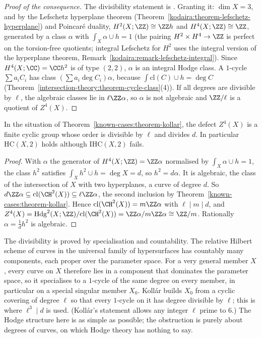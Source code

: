 \begin{proof}[Proof of the consequence]
The divisibility statement is \cite{kollar-1992}. Granting it: $\dim X = 3$, and by the Lefschetz hyperplane theorem (Theorem~\ref{kodaira:theorem-lefschetz-hyperplane}) and Poincar\'e duality,
$H^2(X; \ZZ) \cong \ZZ h$ and $H^4(X; \ZZ) \cong \ZZ$, generated by a class $\alpha$ with $\int_X\alpha \cup h = 1$ (the pairing $H^2 \times H^4 \to \ZZ$ is perfect on the torsion-free quotients; integral
Lefschetz for $H^2$ uses the integral version of the hyperplane theorem, Remark~\ref{kodaira:remark-lefschetz-integral}). Since $H^4(X; \CC) = \CC h^2$ is of type $(2,2)$, $\alpha$ is an integral Hodge class. A
$1$-cycle $\sum a_iC_i$ has class $(\sum a_i\deg C_i)\alpha$, because $\int\mathrm{cl}(C) \cup h = \deg C$ (Theorem~\ref{intersection-theory:theorem-cycle-class}(4)). If all degrees are divisible by $\ell$, the algebraic
classes lie in $\ell\ZZ\alpha$, so $\alpha$ is not algebraic and $\ZZ/\ell$ is a quotient of $Z^4(X)$.
\end{proof}

\begin{corollary}\label{known-cases:corollary-kollar-defect}
In the situation of Theorem~\ref{known-cases:theorem-kollar}, the defect $Z^4(X)$ is a finite cyclic group whose order is divisible by $\ell$ and divides $d$. In particular $\mathrm{HC}(X, 2)$ holds although
$\mathrm{IHC}(X, 2)$ fails.
\end{corollary}

\begin{proof}
With $\alpha$ the generator of $H^4(X; \ZZ) = \ZZ\alpha$ normalised by $\int_X\alpha \cup h = 1$, the class $h^2$ satisfies $\int_Xh^2 \cup h = \deg X = d$, so $h^2 = d\alpha$. It is algebraic, the class of the intersection of $X$
with two hyperplanes, a curve of degree $d$. So $d\ZZ\alpha \subseteq \mathrm{cl}(\CH^2(X)) \subseteq \ell\ZZ\alpha$, the second inclusion by Theorem~\ref{known-cases:theorem-kollar}. Hence
$\mathrm{cl}(\CH^2(X)) = m\ZZ\alpha$ with $\ell \mid m \mid d$, and $Z^4(X) = \mathrm{Hdg}^2(X; \ZZ)/\mathrm{cl}(\CH^2(X)) = \ZZ\alpha/m\ZZ\alpha \cong \ZZ/m$. Rationally $\alpha = \frac1dh^2$ is algebraic.
\end{proof}

\begin{remark}\label{known-cases:remark-kollar-mechanism}
The divisibility is proved by specialisation and countability. The relative Hilbert scheme of curves in the universal family of hypersurfaces has countably many components, each proper over the
parameter space. For a very general member $X$, every curve on $X$ therefore lies in a component that dominates the parameter space, so it specialises to a $1$-cycle of the same degree on every
member, in particular on a special singular member $X_0$. Koll\'ar builds $X_0$ from a cyclic covering of degree $\ell$ so that every $1$-cycle on it has degree divisible by $\ell$; this is where
$\ell^3 \mid d$ is used. (Koll\'ar's statement allows any integer $\ell$ prime to $6$.) The Hodge structure here is as simple as possible; the obstruction is purely about degrees of curves, on which Hodge theory has nothing to say.
\end{remark}

